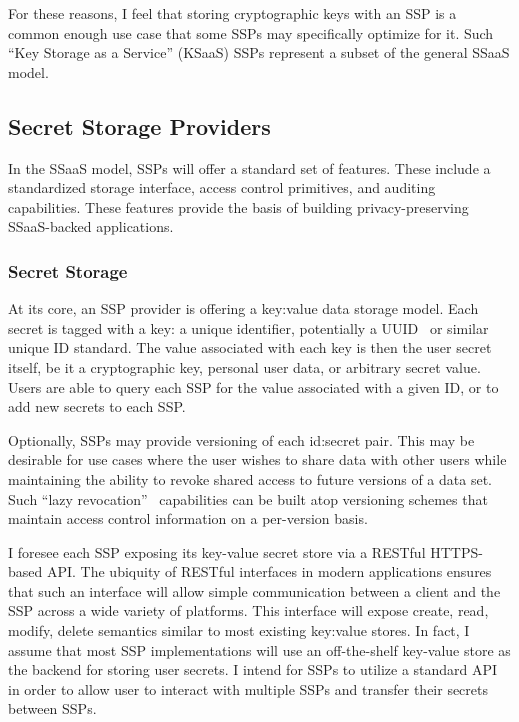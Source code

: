 For these reasons, I feel that storing cryptographic keys with an SSP
is a common enough use case that some SSPs may specifically optimize
for it. Such ``Key Storage as a Service'' (KSaaS) SSPs represent a
subset of the general SSaaS model.

\subsection{Secret Storage Providers}

In the SSaaS model, SSPs will offer a standard set of features. These
include a standardized storage interface, access control primitives,
and auditing capabilities. These features provide the basis of
building privacy-preserving SSaaS-backed applications.

\subsubsection{Secret Storage}

At its core, an SSP provider is offering a key:value data storage
model. Each secret is tagged with a key: a unique identifier,
potentially a UUID~\cite{leach2005} or similar unique ID standard. The
value associated with each key is then the user secret itself, be it a
cryptographic key, personal user data, or arbitrary secret
value. Users are able to query each SSP for the value associated with
a given ID, or to add new secrets to each SSP.

Optionally, SSPs may provide versioning of each id:secret pair. This
may be desirable for use cases where the user wishes to share data
with other users while maintaining the ability to revoke shared access
to future versions of a data set. Such ``lazy
revocation''~\cite{kallahalla2003} capabilities can be built atop
versioning schemes that maintain access control information on a
per-version basis.

I foresee each SSP exposing its key-value secret store via a RESTful
HTTPS-based API. The ubiquity of RESTful interfaces in modern
applications ensures that such an interface will allow simple
communication between a client and the SSP across a wide variety of
platforms. This interface will expose create, read, modify, delete
semantics similar to most existing key:value stores. In fact, I assume
that most SSP implementations will use an off-the-shelf key-value
store as the backend for storing user secrets. I intend for SSPs to
utilize a standard API in order to allow user to interact with
multiple SSPs and transfer their secrets between SSPs.

